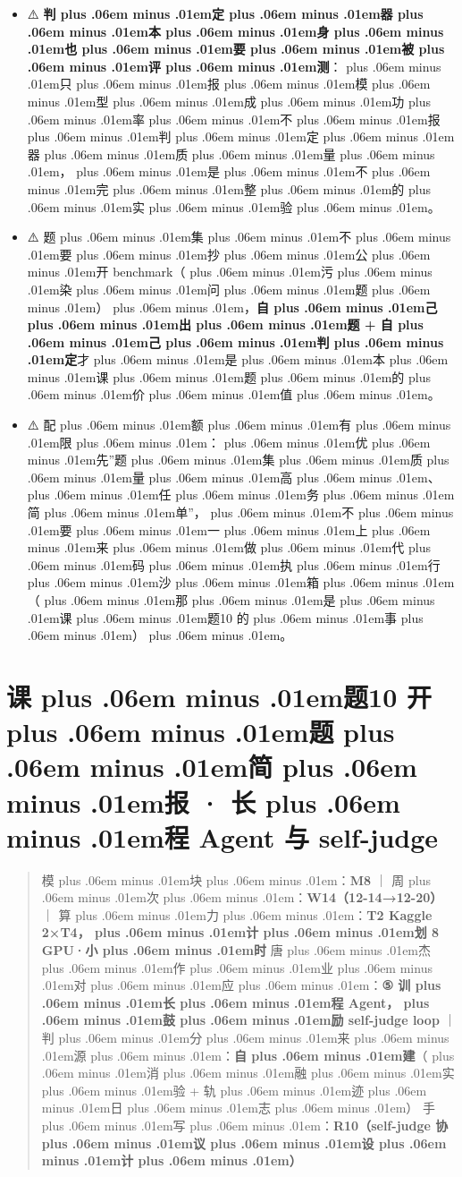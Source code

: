 \documentclass[
]{article}
\providecommand{\tightlist}{%
  \setlength{\itemsep}{0pt}\setlength{\parskip}{0pt}}
\def\zh#1{{\zhfont #1}}
\def\sym#1{{\symfont #1}}
\def\zhglue{\hskip0pt plus .06em minus .01em}
\begin{document}
\begin{itemize}
\tightlist
\item
  \sym{⚠️} \textbf{\zh{判\zhglue 定\zhglue 器\zhglue 本\zhglue 身\zhglue 也\zhglue 要\zhglue 被\zhglue 评\zhglue 测}}\zh{：\zhglue 只\zhglue 报\zhglue 模\zhglue 型\zhglue 成\zhglue 功\zhglue 率\zhglue 不\zhglue 报\zhglue 判\zhglue 定\zhglue 器\zhglue 质\zhglue 量\zhglue ，\zhglue 是\zhglue 不\zhglue 完\zhglue 整\zhglue 的\zhglue 实\zhglue 验\zhglue 。}
\item
  \sym{⚠️} \zh{题\zhglue 集\zhglue 不\zhglue 要\zhglue 抄\zhglue 公\zhglue 开} benchmark\zh{（\zhglue 污\zhglue 染\zhglue 问\zhglue 题\zhglue ）\zhglue ，}\textbf{\zh{自\zhglue 己\zhglue 出\zhglue 题} + \zh{自\zhglue 己\zhglue 判\zhglue 定}}\zh{才\zhglue 是\zhglue 本\zhglue 课\zhglue 题\zhglue 的\zhglue 价\zhglue 值\zhglue 。}
\item
  \sym{⚠️} \zh{配\zhglue 额\zhglue 有\zhglue 限\zhglue ：\zhglue 优\zhglue 先}''\zh{题\zhglue 集\zhglue 质\zhglue 量\zhglue 高\zhglue 、\zhglue 任\zhglue 务\zhglue 简\zhglue 单}''\zh{，\zhglue 不\zhglue 要\zhglue 一\zhglue 上\zhglue 来\zhglue 做\zhglue 代\zhglue 码\zhglue 执\zhglue 行\zhglue 沙\zhglue 箱\zhglue （\zhglue 那\zhglue 是\zhglue 课\zhglue 题}10 \zh{的\zhglue 事\zhglue ）\zhglue 。}
\end{itemize}

\newpage

\section{\zh{课\zhglue 题}10 \zh{开\zhglue 题\zhglue 简\zhglue 报} \sym{·} \zh{长\zhglue 程} Agent \zh{与} self-judge}\label{ux8bfeux989810-ux5f00ux9898ux7b80ux62a5-ux957fux7a0b-agent-ux4e0e-self-judge}

\begin{quote}
\zh{模\zhglue 块\zhglue ：}\textbf{M8} \zh{｜} \zh{周\zhglue 次\zhglue ：}\textbf{W14\zh{（}12-14\sym{→}12-20\zh{）}} \zh{｜} \zh{算\zhglue 力\zhglue ：}\textbf{T2 Kaggle 2\sym{×}T4\zh{，\zhglue 计\zhglue 划} 8 GPU\sym{·}\zh{小\zhglue 时}} \zh{唐\zhglue 杰\zhglue 作\zhglue 业\zhglue 对\zhglue 应\zhglue ：}\textbf{\sym{⑤} \zh{训\zhglue 长\zhglue 程} Agent\zh{，\zhglue 鼓\zhglue 励} self-judge loop} \zh{｜} \zh{判\zhglue 分\zhglue 来\zhglue 源\zhglue ：}\textbf{\zh{自\zhglue 建}}\zh{（\zhglue 消\zhglue 融\zhglue 实\zhglue 验} + \zh{轨\zhglue 迹\zhglue 日\zhglue 志\zhglue ）} \zh{手\zhglue 写\zhglue ：}\textbf{R10\zh{（}self-judge \zh{协\zhglue 议\zhglue 设\zhglue 计\zhglue ）}}
\end{quote}
\end{document}
